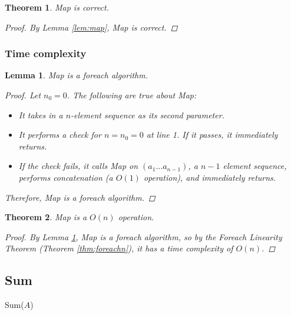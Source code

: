 \documentclass{article}
\newtheorem{theorem}{Theorem}
\newtheorem{lemma}{Lemma}
\theoremstyle{definition}
\begin{document}
\begin{theorem}
    Map is correct.
    \begin{proof}
        By Lemma \ref{lem:map}, Map is correct.
    \end{proof}
\end{theorem}

\subsubsection{Time complexity}

\begin{lemma}
    Map is a foreach algorithm.
    \label{lem:mapforeach}
    \begin{proof}
        Let $n_0 = 0$. The following are true about Map:
        \begin{itemize}
            \item It takes in a $n$-element sequence as its second parameter.
            \item It performs a check for $n = n_0 = 0$ at line 1. If it passes, it immediately returns.
            \item If the check fails, it calls Map on $(a_1 \dots a_{n-1})$, a $n-1$ element sequence, performs concatenation (a $O(1)$ operation), and immediately returns.
        \end{itemize}
        
        Therefore, Map is a foreach algorithm.
    \end{proof}
\end{lemma}

\begin{theorem}
    Map is a $O(n)$ operation.
    \label{thm:omap}
    \begin{proof}
        By Lemma \ref{lem:mapforeach}, Map is a foreach algorithm, so by the Foreach Linearity Theorem (Theorem \ref{thm:foreachn}), it has a time complexity of $O(n)$.
    \end{proof}
\end{theorem}

\subsection{Sum}

\begin{algorithm}

    \caption{Sum($A$)}
\end{algorithm}
\end{document}
